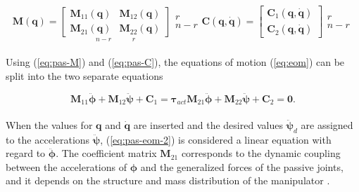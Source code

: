 \begin{subequations}
\begin{equation}\label{eq:pas-M}
    \mathbf{M(q)} =
    \underset{n-r\quad\quad\quad r}{\begin{bmatrix}
        \mathbf{M}_{11}(\mathbf{q}) & \mathbf{M}_{12}(\mathbf{q})\\
        \mathbf{M}_{21}(\mathbf{q}) & \mathbf{M}_{22}(\mathbf{q})
    \end{bmatrix}}
    \begin{matrix}
        r\\n-r
    \end{matrix}
\end{equation}
\begin{equation}\label{eq:pas-C}
    \mathbf{C(q,\dot{q})} =
    \begin{bmatrix}
        \mathbf{C}_1(\mathbf{q,\dot{q}})\\
        \mathbf{C}_2(\mathbf{q,\dot{q}})
    \end{bmatrix}
    \begin{matrix}
        r\\n-r
    \end{matrix}
\end{equation}
\end{subequations}
\\
Using (\ref{eq:pas-M}) and (\ref{eq:pas-C}), the equations of motion (\ref{eq:eom}) can be split into the two separate equations

\begin{subequations}
\begin{equation}\label{eq:pas-eom-1}
    \mathbf{M}_{11} \ddot{\boldsymbol{\phi}} + \mathbf{M}_{12} \ddot{\boldsymbol{\psi}} + \mathbf{C}_1 = \boldsymbol{\tau}_{act}
\end{equation}
\begin{equation}\label{eq:pas-eom-2}
    \mathbf{M}_{21} \ddot{\boldsymbol{\phi}} + \mathbf{M}_{22} \ddot{\boldsymbol{\psi}} + \mathbf{C}_2 = \mathbf{0}.
\end{equation}
\end{subequations}
\\
When the values for $\mathbf{q}$ and $\dot{\mathbf{q}}$ are inserted and the desired values $\ddot{\boldsymbol{\psi}}_d$ are assigned to the accelerations $\ddot{\boldsymbol{\psi}}$, (\ref{eq:pas-eom-2}) is considered a linear equation with regard to $\ddot{\boldsymbol{\phi}}$. The coefficient matrix $\mathbf{M}_{21}$ corresponds to the dynamic coupling between the accelerations of $\boldsymbol{\phi}$ and the generalized forces of the passive joints, and it depends on the structure and mass distribution of the manipulator \cite{arai1991position}.

